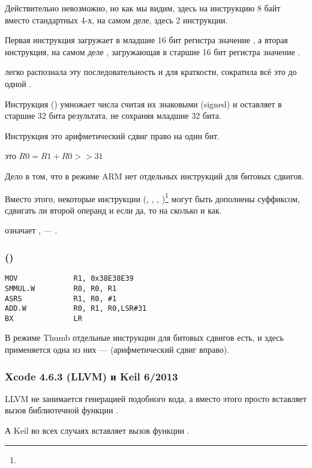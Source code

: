 Действительно невозможно, но как мы видим, здесь на инструкцию 8 байт вместо стандартных 4-х,
на самом деле, здесь 2 инструкции.

Первая инструкция загружает в младшие 16 бит регистра значение , а вторая инструкция, 
на самом деле , загружающая в старшие 16 бит регистра значение .

\IDA легко распознала эту последовательность и для краткости, сократила всё это до одной .

Инструкция  () 
умножает числа считая их знаковыми (signed) и оставляет в  старшие 32 бита результата, 
не сохраняя младшие 32 бита.

Инструкция это арифметический сдвиг право на один бит.

 это $R0=R1 + R0>>31$

\label{shifts_in_ARM_mode}
Дело в том, что в режиме ARM нет отдельных инструкций для битовых сдвигов.

Вместо этого, некоторые инструкции 
(\MOV, \ADD, \SUB, )\footnote{\DataProcessingInstructionsFootNote}
могут быть дополнены суффиксом, сдвигать ли второй операнд и если да, то на сколько и как.

 означает ,  --- .

\subsubsection{\OptimizingXcodeIV (\ThumbTwoMode)}

\begin{lstlisting}[style=customasmARM]
MOV             R1, 0x38E38E39
SMMUL.W         R0, R0, R1
ASRS            R1, R0, #1
ADD.W           R0, R1, R0,LSR#31
BX              LR
\end{lstlisting}

В режиме Thumb отдельные инструкции для битовых сдвигов есть, и здесь применяется одна из них --- 
(арифметический сдвиг вправо).

\subsubsection{\NonOptimizing Xcode 4.6.3 (LLVM) и Keil 6/2013}

\NonOptimizing LLVM 
не занимается генерацией подобного кода, а вместо этого просто вставляет вызов
библиотечной функции .

А Keil во всех случаях вставляет вызов функции .
